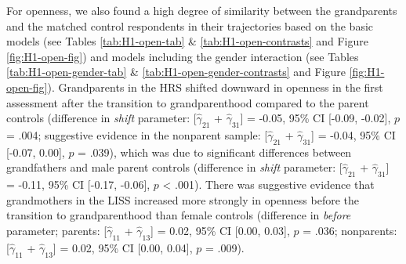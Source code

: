 \documentclass[
  english,
  man, noextraspace]{apa7}
\begin{document}
For openness, we also found a high degree of similarity between the grandparents and the matched control respondents in their trajectories based on the basic models (see Tables \ref{tab:H1-open-tab} \& \ref{tab:H1-open-contrasts} and Figure \ref{fig:H1-open-fig}) and models including the gender interaction (see Tables \ref{tab:H1-open-gender-tab} \& \ref{tab:H1-open-gender-contrasts} and Figure \ref{fig:H1-open-fig}). Grandparents in the HRS shifted downward in openness in the first assessment after the transition to grandparenthood compared to the parent controls (difference in \emph{shift} parameter: {[}\(\hat{\gamma}_{21}\) + \(\hat{\gamma}_{31}\){]} = -0.05, 95\% CI {[}-0.09, -0.02{]}, \(p\) = .004; suggestive evidence in the nonparent sample: {[}\(\hat{\gamma}_{21}\) + \(\hat{\gamma}_{31}\){]} = -0.04, 95\% CI {[}-0.07, 0.00{]}, \(p\) = .039), which was due to significant differences between grandfathers and male parent controls (difference in \emph{shift} parameter: {[}\(\hat{\gamma}_{21}\) + \(\hat{\gamma}_{31}\){]} = -0.11, 95\% CI {[}-0.17, -0.06{]}, \(p\) \textless{} .001). There was suggestive evidence that grandmothers in the LISS increased more strongly in openness before the transition to grandparenthood than female controls (difference in \emph{before} parameter; parents: {[}\(\hat{\gamma}_{11}\) + \(\hat{\gamma}_{13}\){]} = 0.02, 95\% CI {[}0.00, 0.03{]}, \(p\) = .036; nonparents: {[}\(\hat{\gamma}_{11}\) + \(\hat{\gamma}_{13}\){]} = 0.02, 95\% CI {[}0.00, 0.04{]}, \(p\) = .009).\\
\end{document}

